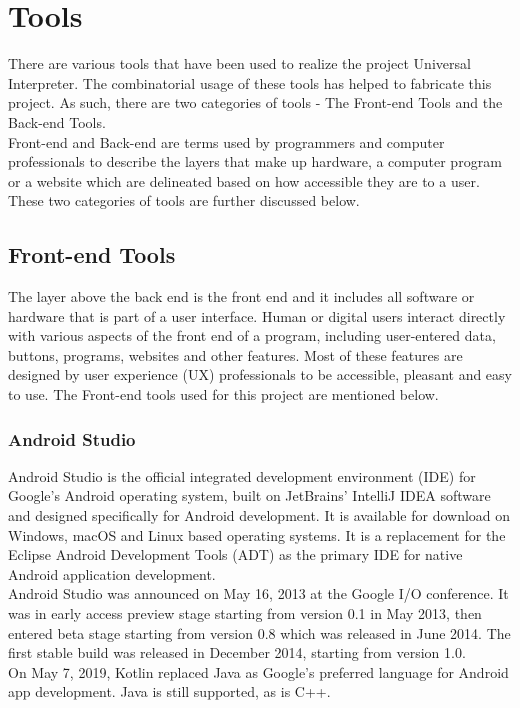 \documentclass[14pt]{report}
\begin{document}
		\section{Tools}
			There are various tools that have been used to realize the project Universal Interpreter. The combinatorial usage of these tools has helped to fabricate this project. As such, there are two categories of tools - The Front-end Tools and the Back-end Tools. \\
			
			Front-end and Back-end are terms used by programmers and computer professionals to describe the layers that make up hardware, a computer program or a website which are delineated based on how accessible they are to a user. These two categories of tools are further discussed below. 
			\subsection{Front-end Tools}
				The layer above the back end is the front end and it includes all software or hardware that is part of a user interface. Human or digital users interact directly with various aspects of the front end of a program, including user-entered data, buttons, programs, websites and other features. Most of these features are designed by user experience (UX) professionals to be accessible, pleasant and easy to use. The Front-end tools used for this project are mentioned below.
				\subsubsection{Android Studio}
				Android Studio is the official integrated development environment (IDE) for Google's Android operating system, built on JetBrains' IntelliJ IDEA software and designed specifically for Android development. It is available for download on Windows, macOS and Linux based operating systems. It is a replacement for the Eclipse Android Development Tools (ADT) as the primary IDE for native Android application development.\\

				Android Studio was announced on May 16, 2013 at the Google I/O conference. It was in early access preview stage starting from version 0.1 in May 2013, then entered beta stage starting from version 0.8 which was released in June 2014. The first stable build was released in December 2014, starting from version 1.0.\\
				
				On May 7, 2019, Kotlin replaced Java as Google’s preferred language for Android app development. Java is still supported, as is C++.\\ 
				
\end{document}
